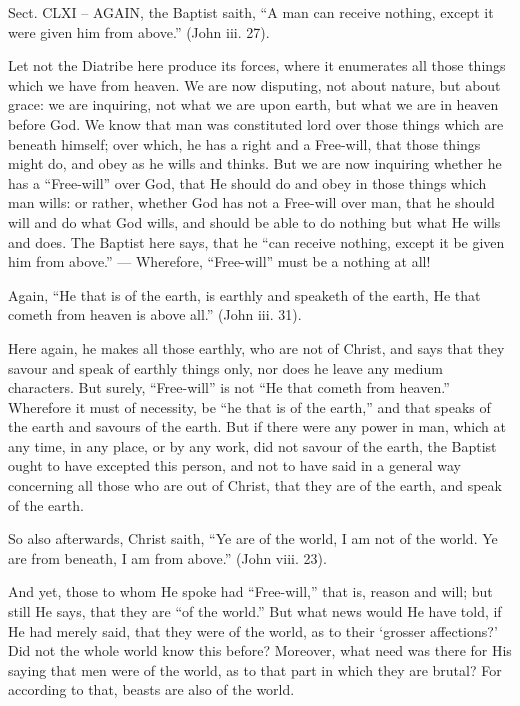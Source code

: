 
Sect. CLXI – AGAIN, the Baptist saith, “A man can receive nothing, except it were given him from above.” (John iii. 27).

Let not the Diatribe here produce its forces, where it enumerates all those things which we have from heaven. We are now disputing, not about nature, but about grace: we are inquiring, not what we are upon earth, but what we are in heaven before God. We know that man was constituted lord over those things which are beneath himself; over which, he has a right and a Free-will, that those things might do, and obey as he wills and thinks. But we are now inquiring whether he has a “Free-will” over God, that He should do and obey in those things which man wills: or rather, whether God has not a Free-will over man, that he should will and do what God wills, and should be able to do nothing but what He wills and does. The Baptist here says, that he “can receive nothing, except it be given him from above.” — Wherefore, “Free-will” must be a nothing at all!

Again, “He that is of the earth, is earthly and speaketh of the earth, He that cometh from heaven is above all.” (John iii. 31).

Here again, he makes all those earthly, who are not of Christ, and says that they savour and speak of earthly things only, nor does he leave any medium characters. But surely, “Free-will” is not “He that cometh from heaven.” Wherefore it must of necessity, be “he that is of the earth,” and that speaks of the earth and savours of the earth. But if there were any power in man, which at any time, in any place, or by any work, did not savour of the earth, the Baptist ought to have excepted this person, and not to have said in a general way concerning all those who are out of Christ, that they are of the earth, and speak of the earth.

So also afterwards, Christ saith, “Ye are of the world, I am not of the world. Ye are from beneath, I am from above.” (John viii. 23).

And yet, those to whom He spoke had “Free-will,” that is, reason and will; but still He says, that they are “of the world.” But what news would He have told, if He had merely said, that they were of the world, as to their ‘grosser affections?’ Did not the whole world know this before? Moreover, what need was there for His saying that men were of the world, as to that part in which they are brutal? For according to that, beasts are also of the world.

